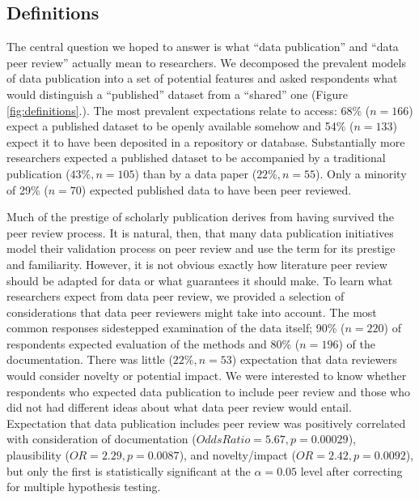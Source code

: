\documentclass[10pt]{article}
\begin{document}
\subsection*{Definitions}

The central question we hoped to answer is what ``data publication'' and ``data peer review'' actually mean to researchers.
We decomposed the prevalent models of data publication into a set of potential features and asked respondents what would distinguish a ``published'' dataset from a ``shared'' one (Figure \ref{fig:definitions}.).
The most prevalent expectations relate to access: 68\% ($n=166$) expect a published dataset to be openly available somehow and 54\% ($n=133$) expect it to have been deposited in a repository or database.
Substantially more researchers expected a published dataset to be accompanied by a traditional publication ($43\%, n=105$) than by a data paper ($22\%, n=55$).
Only a minority of 29\% ($n=70$) expected published data to have been peer reviewed.

Much of the prestige of scholarly publication derives from having survived the peer review process.
It is natural, then, that many data publication initiatives model their validation process on peer review and use the term for its prestige and familiarity.
However, it is not obvious exactly how literature peer review should be adapted for data or what guarantees it should make.
To learn what researchers expect from data peer review, we provided a selection of considerations that data peer reviewers might take into account.
The most common responses sidestepped examination of the data itself; 90\% ($n=220$) of respondents expected evaluation of the methods and 80\% ($n=196$) of the documentation.
There was little ($22\%, n=53$) expectation that data reviewers would consider novelty or potential impact.
We were interested to know whether respondents who expected data publication to include peer review and those who did not had different ideas about what data peer review would entail.  
Expectation that data publication includes peer review was positively correlated with consideration of documentation ($Odds Ratio= 5.67, p=0.00029$), plausibility ($OR= 2.29, p=0.0087$), and novelty/impact ($OR= 2.42, p= 0.0092$), but only the first is statistically significant at the $\alpha= 0.05$ level after correcting for multiple hypothesis testing.
\end{document}
